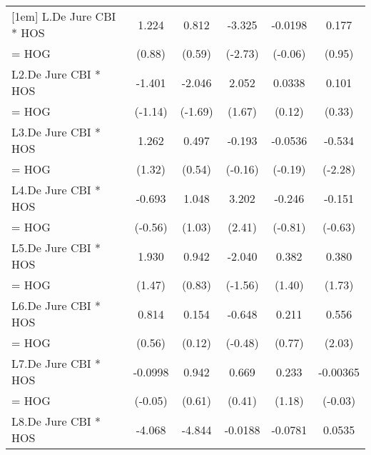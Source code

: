 {\begin{tabular}{l*{5}{c}}
[1em]
L.De Jure CBI * HOS &       1.224         &       0.812         &      -3.325\sym{**} &     -0.0198         &       0.177         \\
= HOG               &      (0.88)         &      (0.59)         &     (-2.73)         &     (-0.06)         &      (0.95)         \\
[1em]
L2.De Jure CBI * HOS&      -1.401         &      -2.046         &       2.052         &      0.0338         &       0.101         \\
= HOG               &     (-1.14)         &     (-1.69)         &      (1.67)         &      (0.12)         &      (0.33)         \\
[1em]
L3.De Jure CBI * HOS&       1.262         &       0.497         &      -0.193         &     -0.0536         &      -0.534\sym{*}  \\
= HOG               &      (1.32)         &      (0.54)         &     (-0.16)         &     (-0.19)         &     (-2.28)         \\
[1em]
L4.De Jure CBI * HOS&      -0.693         &       1.048         &       3.202\sym{*}  &      -0.246         &      -0.151         \\
= HOG               &     (-0.56)         &      (1.03)         &      (2.41)         &     (-0.81)         &     (-0.63)         \\
[1em]
L5.De Jure CBI * HOS&       1.930         &       0.942         &      -2.040         &       0.382         &       0.380         \\
= HOG               &      (1.47)         &      (0.83)         &     (-1.56)         &      (1.40)         &      (1.73)         \\
[1em]
L6.De Jure CBI * HOS&       0.814         &       0.154         &      -0.648         &       0.211         &       0.556\sym{*}  \\
= HOG               &      (0.56)         &      (0.12)         &     (-0.48)         &      (0.77)         &      (2.03)         \\
[1em]
L7.De Jure CBI * HOS&     -0.0998         &       0.942         &       0.669         &       0.233         &    -0.00365         \\
= HOG               &     (-0.05)         &      (0.61)         &      (0.41)         &      (1.18)         &     (-0.03)         \\
[1em]
L8.De Jure CBI * HOS&      -4.068\sym{*}  &      -4.844\sym{***}&     -0.0188         &     -0.0781         &      0.0535         \\

\end{tabular}}
